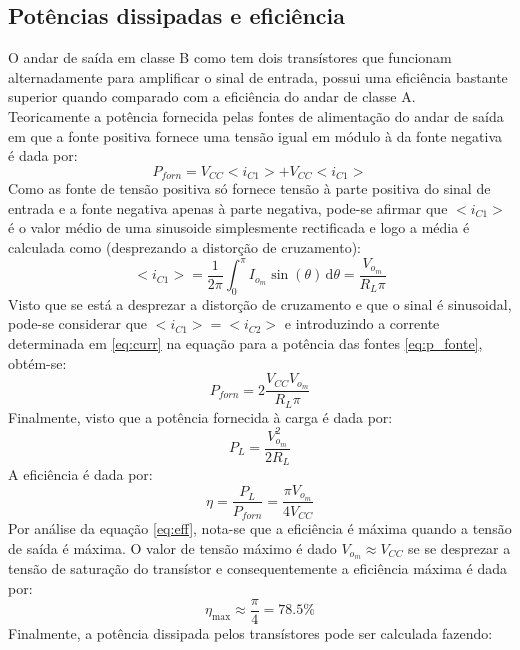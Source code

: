 \documentclass[%
  reprint,
  nofootinbib,
  amsmath,amssymb,
  aps,
  10pt,
  a4paper
]{revtex4-1}
\begin{document}
\subsection{Potências dissipadas e eficiência}
O andar de saída em classe B como tem dois transístores que funcionam alternadamente para amplificar o sinal de entrada, possui uma eficiência bastante superior quando comparado com a eficiência do andar de classe A.\\
Teoricamente a potência fornecida pelas fontes de alimentação do andar de saída em que a fonte positiva fornece uma tensão igual em módulo à da fonte negativa é dada por:
\begin{equation}
P_{forn}=V_{CC}<i_{C1}>+V_{CC}<i_{C1}>
\label{eq:p_fonte}
\end{equation}
Como as fonte de tensão positiva só fornece tensão à parte positiva do sinal de entrada e a fonte negativa apenas à parte negativa, pode-se afirmar que $<i_{C1}>$ é o valor médio de uma sinusoide simplesmente rectificada e logo a média é calculada como (desprezando a distorção de cruzamento):
\begin{equation}
<i_{C1}>=\frac{1}{2\pi}\int_0^{\pi} \! I_{o_m}\sin(\theta) \, \mathrm{d}\theta=\frac{V_{o_m}}{R_L\pi}
\label{eq:curr}
\end{equation}
Visto que se está a desprezar a distorção de cruzamento e que o sinal é sinusoidal, pode-se considerar que $<i_{C1}>=<i_{C2}>$ e introduzindo a corrente determinada em \ref{eq:curr} na equação para a potência das fontes \ref{eq:p_fonte}, obtém-se:
\begin{equation}
P_{forn}=2\frac{V_{CC}V_{o_m}}{R_L\pi}
\label{eq:p_fonte_f}
\end{equation}
Finalmente, visto que a potência fornecida à carga é dada por:
\begin{equation}
P_L=\frac{V_{o_m}^2}{2R_L}
\end{equation}
A eficiência é dada por:
\begin{equation}
\eta=\frac{P_L}{P_{forn}}=\frac{\pi V_{o_m}}{4V_{CC}}
\label{eq:eff}
\end{equation}
Por análise da equação \ref{eq:eff}, nota-se que a eficiência é máxima quando a tensão de saída é máxima. O valor de tensão máximo é dado $V_{o_m}\approx V_{CC}$ se se desprezar a tensão de saturação do transístor e consequentemente a eficiência máxima é dada por:
\begin{equation}
\eta_{\mathrm{max}}\approx \frac{\pi}{4}=78.5\%
\end{equation}
Finalmente, a potência dissipada pelos transístores pode ser calculada fazendo:
\end{document}
